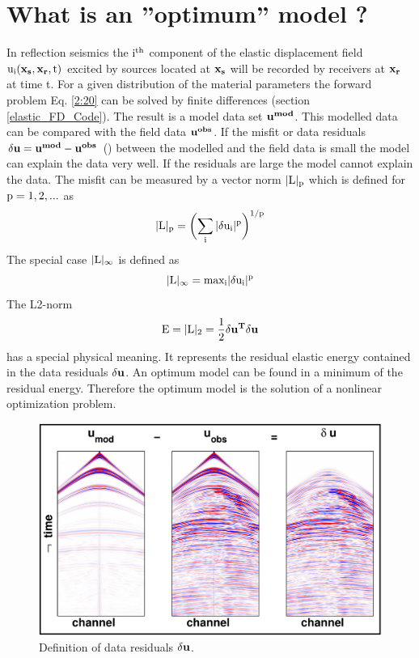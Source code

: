 \section{What is an ''optimum'' model ?}
In reflection seismics the $\rm{i^{th}}$ component of the elastic displacement field $\rm{u_i(\mathbf{x_s},\mathbf{x_r},t)}$ 
excited by sources located at $\rm{\mathbf{x_s}}$ will be recorded by receivers at $\rm{\mathbf{x_r}}$ at time t. 
For a given distribution of the material parameters the forward problem Eq. \ref{2:20} can be solved by finite differences (section \ref{elastic_FD_Code}). The result is a model data set $\rm{\mathbf{u^{mod}}}$. This modelled data can be compared with the field data $\rm{\mathbf{u^{obs}}}$. If the misfit or data residuals $\rm{\delta \mathbf{u} = \mathbf{u^{mod}} - \mathbf{u^{obs}}}$ () between the modelled and the field data is small the model can explain the data very well. If the residuals are large the model cannot explain the data. The misfit can be measured by a vector norm $\rm{|L|_p}$ which is defined for $\rm{p=1,2,...}$ as  
\begin{equation} 
\rm{|L|_p = \biggl(\sum_i|\delta u_i|^p\biggr)^{1/p}} 
\end{equation} 
The special case $\rm{|L|_\infty}$ is defined as
\begin{equation} 
\rm{|L|_\infty = max_i|\delta u_i|^p} 
\label{l-infty}
\end{equation} 
The L2-norm 
\begin{equation} 
\rm{E=|L|_2 = \frac{1}{2}\mathbf{\delta u^T} \mathbf{\delta u}} 
\label{l-norm}
\end{equation} 
has a special physical meaning. It represents the residual elastic energy contained in the data residuals $\rm{\delta \mathbf{u}}$. An optimum model can be found in a minimum of the residual energy. Therefore the optimum model is the solution of a nonlinear optimization problem.
\begin{figure}[!bh]
\begin{center}
\includegraphics[width=15 cm]{figures/data_res_sketch_1.pdf}
\caption{Definition of data residuals $\rm{\mathbf{\delta u}}$.}
\label{sketch_data_res}
\end{center}
\end{figure} 
\newpage
